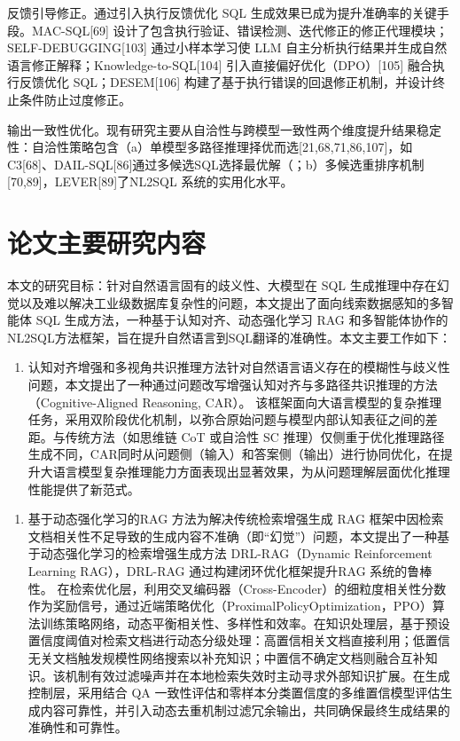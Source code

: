 \documentclass[12pt,a4paper,openright,UTF8]{ctexbook}
\begin{document}
反馈引导修正。通过引入执行反馈优化 SQL 生成效果已成为提升准确率的关键手段。MAC-SQL[69] 设计了包含执行验证、错误检测、迭代修正的修正代理模块；SELF-DEBUGGING[103] 通过小样本学习使 LLM 自主分析执行结果并生成自然语言修正解释；Knowledge-to-SQL[104] 引入直接偏好优化（DPO）[105] 融合执行反馈优化 SQL；DESEM[106] 构建了基于执行错误的回退修正机制，并设计终止条件防止过度修正。


输出一致性优化。现有研究主要从自洽性与跨模型一致性两个维度提升结果稳定性：自洽性策略包含（a）单模型多路径推理择优而选[21,68,71,86,107]，如C3[68]、DAIL-SQL[86]通过多候选SQL选择最优解（；b）多候选重排序机制[70,89]，LEVER[89]了NL2SQL 系统的实用化水平。

\section{论文主要研究内容}

本文的研究目标：针对自然语言固有的歧义性、大模型在 SQL 生成推理中存在幻觉以及难以解决工业级数据库复杂性的问题，本文提出了面向线索数据感知的多智能体 SQL 生成方法，一种基于认知对齐、动态强化学习 RAG 和多智能体协作的NL2SQL方法框架，旨在提升自然语言到SQL翻译的准确性。本文主要工作如下：

\begin{enumerate}[label=(\arabic*)]
\item 认知对齐增强和多视角共识推理方法针对自然语言语义存在的模糊性与歧义性问题，本文提出了一种通过问题改写增强认知对齐与多路径共识推理的方法（Cognitive-Aligned Reasoning, CAR）。 该框架面向大语言模型的复杂推理任务，采用双阶段优化机制，以弥合原始问题与模型内部认知表征之间的差距。与传统方法（如思维链 CoT 或自洽性 SC 推理）仅侧重于优化推理路径生成不同，CAR同时从问题侧（输入）和答案侧（输出）进行协同优化，在提升大语言模型复杂推理能力方面表现出显著效果，为从问题理解层面优化推理性能提供了新范式。
\end{enumerate}

\begin{enumerate}[label=(\arabic*)]
\item 基于动态强化学习的RAG 方法为解决传统检索增强生成 RAG 框架中因检索文档相关性不足导致的生成内容不准确（即“幻觉”）问题，本文提出了一种基于动态强化学习的检索增强生成方法 DRL-RAG（Dynamic Reinforcement Learning RAG），DRL-RAG 通过构建闭环优化框架提升RAG 系统的鲁棒性。 在检索优化层，利用交叉编码器（Cross-Encoder）的细粒度相关性分数作为奖励信号，通过近端策略优化（ProximalPolicyOptimization，PPO）算法训练策略网络，动态平衡相关性、多样性和效率。在知识处理层，基于预设置信度阈值对检索文档进行动态分级处理：高置信相关文档直接利用；低置信无关文档触发规模性网络搜索以补充知识；中置信不确定文档则融合互补知识。该机制有效过滤噪声并在本地检索失效时主动寻求外部知识扩展。在生成控制层，采用结合 QA 一致性评估和零样本分类置信度的多维置信模型评估生成内容可靠性，并引入动态去重机制过滤冗余输出，共同确保最终生成结果的准确性和可靠性。
\end{enumerate}
\end{document}
